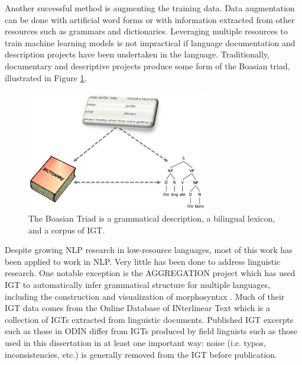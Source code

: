 Another successful method is augmenting the training data. 
Data augmentation can be done with artificial word forms \citep{liu_morphological_2018} or with information extracted from other resources such as grammars and dictionaries. Leveraging multiple resources to train machine learning models is not impractical if language documentation and description projects have been undertaken in the language. Traditionally, documentary and descriptive projects produce some form of the Boasian triad, illustrated in Figure \ref{fig:Triad}. 

\begin{figure}[h!]
\begin{center}
\includegraphics[width=8cm]{figs/Triad.PNG}
\caption[The Boasian Triad]{The Boasian Triad is a grammatical description, a bilingual lexicon, and a corpus of IGT.}
\label{fig:Triad}
\end{center}
\end{figure}


Despite growing NLP research in low-resource languages, most of this work has been applied to work in NLP. Very little has been done to address linguistic research. One notable exception is the AGGREGATION project \citep{bender_language_2014} which has used IGT to automatically infer grammatical structure for multiple languages, including the construction and visualization of morphosyntax \citep{lepp_visualizing_2019,wax_automated_2014}. Much of their IGT data comes from the Online Database of INterlinear Text \citep[ODIN]{lewis_developing_2010} which is a collection of IGTs extracted from linguistic documents. Published IGT excerpts such as those in ODIN differ from IGTs produced by field linguists such as those used in this dissertation in at least one important way: noise (i.e. typos, inconsistencies, etc.) is generally removed from the IGT before publication. 

